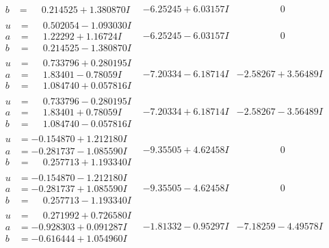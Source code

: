 \documentclass[1p]{elsarticle_modified}
\theoremstyle{definition}
\begin{document}
$$\begin{array}{c|c|c}
\begin{aligned}
b &= \phantom{-}0.214525 + 1.380870 I\end{aligned}
 & -6.25245 + 6.03157 I & \phantom{-0.000000 } 0 \\ \hline\begin{aligned}
u &= \phantom{-}0.502054 - 1.093030 I \\
a &= \phantom{-}1.22292 + 1.16724 I \\
b &= \phantom{-}0.214525 - 1.380870 I\end{aligned}
 & -6.25245 - 6.03157 I & \phantom{-0.000000 } 0 \\ \hline\begin{aligned}
u &= \phantom{-}0.733796 + 0.280195 I \\
a &= \phantom{-}1.83401 - 0.78059 I \\
b &= \phantom{-}1.084740 + 0.057816 I\end{aligned}
 & -7.20334 - 6.18714 I & -2.58267 + 3.56489 I \\ \hline\begin{aligned}
u &= \phantom{-}0.733796 - 0.280195 I \\
a &= \phantom{-}1.83401 + 0.78059 I \\
b &= \phantom{-}1.084740 - 0.057816 I\end{aligned}
 & -7.20334 + 6.18714 I & -2.58267 - 3.56489 I \\ \hline\begin{aligned}
u &= -0.154870 + 1.212180 I \\
a &= -0.281737 - 1.085590 I \\
b &= \phantom{-}0.257713 + 1.193340 I\end{aligned}
 & -9.35505 + 4.62458 I & \phantom{-0.000000 } 0 \\ \hline\begin{aligned}
u &= -0.154870 - 1.212180 I \\
a &= -0.281737 + 1.085590 I \\
b &= \phantom{-}0.257713 - 1.193340 I\end{aligned}
 & -9.35505 - 4.62458 I & \phantom{-0.000000 } 0 \\ \hline\begin{aligned}
u &= \phantom{-}0.271992 + 0.726580 I \\
a &= -0.928303 + 0.091287 I \\
b &= -0.616444 + 1.054960 I\end{aligned}
 & -1.81332 - 0.95297 I & -7.18259 - 4.49578 I \\ \hline\begin{aligned}

\end{aligned}
\end{array}$$
\end{document}
